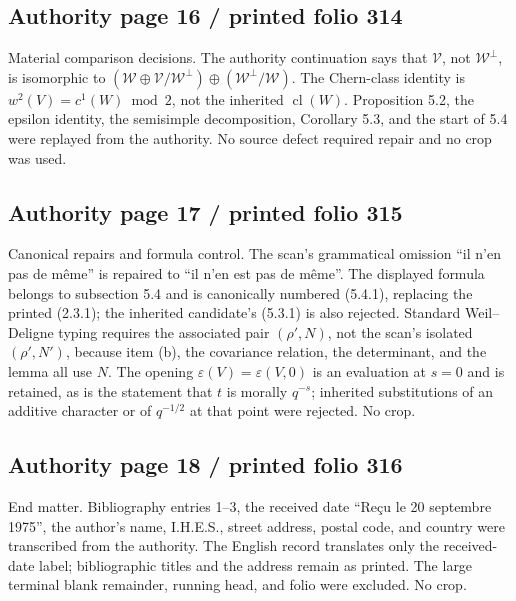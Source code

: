 \documentclass[10pt]{article}
\begin{document}
\subsection*{Authority page 16 / printed folio 314}

Material comparison decisions. The authority continuation says that \(\mathscr V\), not \(\mathscr W^\perp\), is isomorphic to \((\mathscr W\oplus\mathscr V/\mathscr W^\perp)\oplus(\mathscr W^\perp/\mathscr W)\). The Chern-class identity is \(w^2(V)=c^1(W)\bmod 2\), not the inherited \(\operatorname{cl}(W)\). Proposition 5.2, the epsilon identity, the semisimple decomposition, Corollary 5.3, and the start of 5.4 were replayed from the authority. No source defect required repair and no crop was used.\par

\subsection*{Authority page 17 / printed folio 315}

Canonical repairs and formula control. The scan’s grammatical omission “il n’en pas de même” is repaired to “il n’en est pas de même”. The displayed formula belongs to subsection 5.4 and is canonically numbered (5.4.1), replacing the printed (2.3.1); the inherited candidate’s (5.3.1) is also rejected. Standard Weil--Deligne typing requires the associated pair \((\rho',N)\), not the scan’s isolated \((\rho',N')\), because item (b), the covariance relation, the determinant, and the lemma all use \(N\). The opening \(\varepsilon(V)=\varepsilon(V,0)\) is an evaluation at \(s=0\) and is retained, as is the statement that \(t\) is morally \(q^{-s}\); inherited substitutions of an additive character or of \(q^{-1/2}\) at that point were rejected. No crop.\par

\subsection*{Authority page 18 / printed folio 316}

End matter. Bibliography entries 1--3, the received date “Reçu le 20 septembre 1975”, the author’s name, I.H.E.S., street address, postal code, and country were transcribed from the authority. The English record translates only the received-date label; bibliographic titles and the address remain as printed. The large terminal blank remainder, running head, and folio were excluded. No crop.\par
\end{document}
